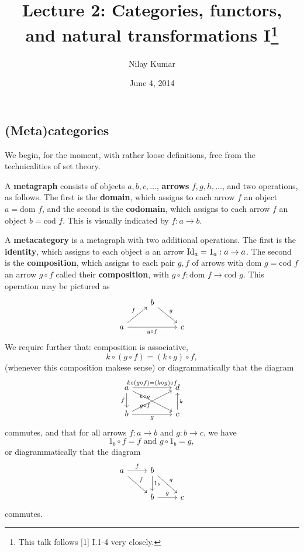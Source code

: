 \documentclass{../../mathnotes}
\title{Lecture 2: Categories, functors, and natural transformations I\footnote{This talk follows [1] I.1-4 very closely.}}
\author{Nilay Kumar}
\date{June 4, 2014}
\begin{document}
\maketitle

\subsection*{(Meta)categories}

We begin, for the moment, with rather loose definitions, free from the technicalities of set theory.

\begin{defn}
    A \textbf{metagraph} consists of objects $a,b,c,\ldots$, \textbf{arrows} $f,g,h,\ldots$, and two
    operations, as follows. The first is the \textbf{domain}, which assigns to each arrow $f$ an object $a=\text{dom }f$,
    and the second is the \textbf{codomain}, which assigns to each arrow $f$ an object $b=\text{cod }f$.
    This is visually indicated by $f:a\to b$.
\end{defn}

\begin{defn}
    A \textbf{metacategory} is a metagraph with two additional operations. The first is the \textbf{identity},
    which assigns to each object $a$ an arrow $\operatorname{Id}_a=1_a:a\to a$. The second is the \textbf{composition},
    which assigns to each pair $g,f$ of arrows with $\text{dom }g=\text{cod }f$ an arrow $g\circ f$ called
    their \textbf{composition}, with $g\circ f:\text{dom }f\to\text{cod }g$. This operation may be pictured as
    \begin{equation*}
        \begin{tikzcd}
            \;&b\ar{rd}{g}&\\
            a\ar{ru}{f}\ar[swap]{rr}{g\circ f}&&c
        \end{tikzcd}
    \end{equation*}
    We require further that: composition is associative,
    \[k\circ(g\circ f)=(k\circ g)\circ f,\]
    (whenever this composition makese sense) or diagrammatically that the diagram
    \begin{equation*}
        \begin{tikzcd}
            a\ar{rr}{k\circ(g\circ f)=(k\circ g)\circ f}\ar[swap]{d}{f}\ar[swap]{drr}{g\circ f} && d\\
            b\ar{urr}{k\circ g}\ar[swap]{rr}{g} && c\ar[swap]{u}{k}
        \end{tikzcd}
    \end{equation*}
    commutes, and that for all arrows $f:a\to b$ and $g:b\to c$, we have
    \[1_b\circ f=f \text{ and }g\circ 1_b=g,\]
    or diagrammatically that the diagram
    \begin{equation*}
        \begin{tikzcd}
            a\ar{r}{f}\ar{dr}{f} & b\ar{d}{1_b}\ar{rd}{g} &\\
            & b\ar{r}{g} & c
        \end{tikzcd}
    \end{equation*}
    commutes.
\end{defn}
\end{document}
